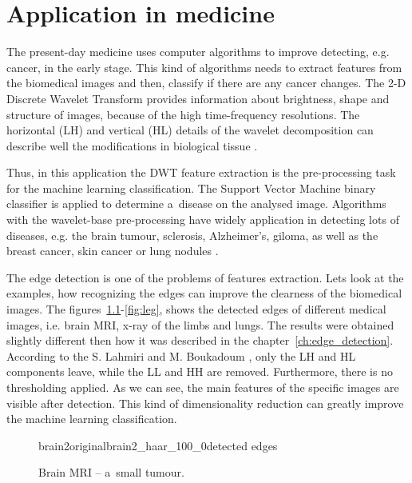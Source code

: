 \chapter{Application in medicine}
\label{ch:medical_application}

The present-day medicine uses computer algorithms to improve detecting, e.g. cancer, in the early stage.
This kind of algorithms needs to extract features from the biomedical images and then, classify if there are any cancer changes. The 2-D Discrete Wavelet Transform provides information about brightness, shape and structure of images, because of the high time-frequency resolutions. The horizontal (LH) and vertical (HL) details of the wavelet decomposition can describe well the modifications in biological tissue \cite{MRI}. 

Thus, in this application the DWT feature extraction is the pre-processing task for the machine learning classification. The Support Vector Machine binary classifier is applied to determine a~disease on the analysed image. Algorithms with the wavelet-base pre-processing have widely application in detecting lots of diseases, e.g. the brain tumour, sclerosis, Alzheimer's, giloma, as well as the breast cancer, skin cancer or lung nodules  \cite{BiomedicalImages}.

The edge detection is one of the problems of features extraction. Lets look at the examples, how recognizing the edges can improve the clearness of the biomedical images. The figures~\ref{fig:brain2}-\ref{fig:leg}, shows the detected edges of different medical images, i.e. brain MRI, x-ray of the limbs and lungs. The results were obtained slightly different then how it was described in the chapter~\ref{ch:edge_detection}. According to the S. Lahmiri and M. Boukadoum \cite{MRI}, only the LH and HL components leave, while the LL and HH are removed. Furthermore, there is no thresholding applied. As we can see, the main features of the specific images are visible after detection. This kind of dimensionality reduction can greatly improve the machine learning classification.

\begin{figure}[h]
	\centering
	\begin{mainsubdiagrams2}{brain2}{original}{brain2_haar_100_0}{detected edges}
	\end{mainsubdiagrams2}
	
	\caption{Brain MRI -- a~small tumour.}
	\label{fig:brain2}
\end{figure}


